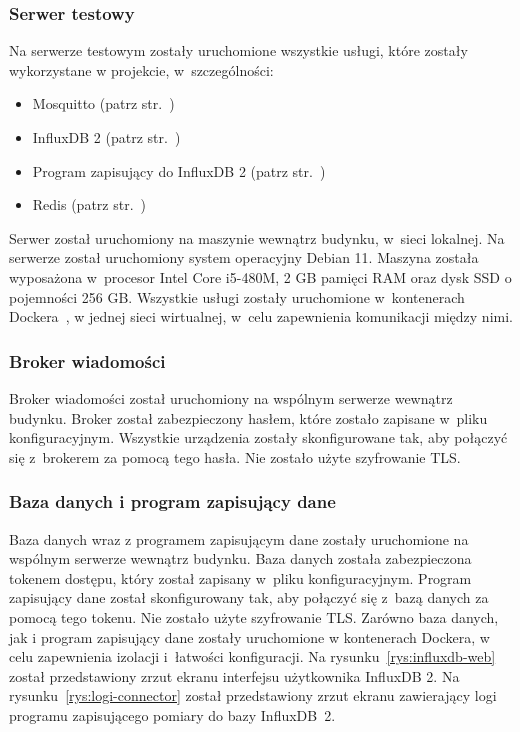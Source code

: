 \subsubsection{Serwer testowy}
Na serwerze testowym zostały uruchomione wszystkie usługi, które zostały wykorzystane w projekcie, w~szczególności:
\begin{itemize}
    \item Mosquitto (patrz str.~\pageref{impl:mosquitto})
    \item InfluxDB 2 (patrz str.~\pageref{impl:db})
    \item Program zapisujący do InfluxDB 2 (patrz str.~\pageref{impl:save})
    \item Redis (patrz str.~\pageref{impl:redis})
\end{itemize}
Serwer został uruchomiony na maszynie wewnątrz budynku, w~sieci lokalnej.
Na serwerze został uruchomiony system operacyjny Debian 11.
Maszyna została wyposażona w~procesor Intel Core i5-480M, 2 GB pamięci RAM oraz dysk SSD o pojemności 256 GB.
Wszystkie usługi zostały uruchomione w~kontenerach Dockera~\cite{tool:docker}, w jednej sieci wirtualnej, w~celu zapewnienia komunikacji między nimi.

\subsubsection{Broker wiadomości}
Broker wiadomości został uruchomiony na wspólnym serwerze wewnątrz budynku.
Broker został zabezpieczony hasłem, które zostało zapisane w~pliku konfiguracyjnym.
Wszystkie urządzenia zostały skonfigurowane tak, aby połączyć się z~brokerem za pomocą tego hasła.
Nie zostało użyte szyfrowanie TLS.

\subsubsection{Baza danych i program zapisujący dane}
Baza danych wraz z programem zapisującym dane zostały uruchomione na wspólnym serwerze wewnątrz budynku.
Baza danych została zabezpieczona tokenem dostępu, który został zapisany w~pliku konfiguracyjnym.
Program zapisujący dane został skonfigurowany tak, aby połączyć się z~bazą danych za pomocą tego tokenu.
Nie zostało użyte szyfrowanie TLS.
Zarówno baza danych, jak i program zapisujący dane zostały uruchomione w kontenerach Dockera, w celu zapewnienia izolacji i~łatwości konfiguracji.
Na rysunku~\ref{rys:influxdb-web} został przedstawiony zrzut ekranu interfejsu użytkownika InfluxDB 2.
Na rysunku~\ref{rys:logi-connector} został przedstawiony zrzut ekranu zawierający logi programu zapisującego pomiary do bazy InfluxDB~2.

